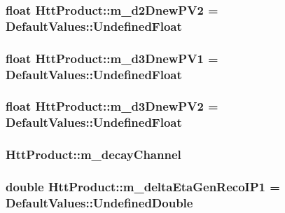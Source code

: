 \label{classHttProduct_a5cd0dab7ec8daff69e1540b1436141f2}
\hypertarget{classHttProduct_a0efa7a19a8e5b0e2129c91ae58cf24f4}{
\subsubsection[{m\_\-d2DnewPV2}]{\setlength{\rightskip}{0pt plus 5cm}float {\bf HttProduct::m\_\-d2DnewPV2} = DefaultValues::UndefinedFloat}}
\label{classHttProduct_a0efa7a19a8e5b0e2129c91ae58cf24f4}
\hypertarget{classHttProduct_a7ceef9ded23ad83000f89af8167cd962}{
\subsubsection[{m\_\-d3DnewPV1}]{\setlength{\rightskip}{0pt plus 5cm}float {\bf HttProduct::m\_\-d3DnewPV1} = DefaultValues::UndefinedFloat}}
\label{classHttProduct_a7ceef9ded23ad83000f89af8167cd962}
\hypertarget{classHttProduct_aef4f07e87a2d4ca39749fb4c2b5e8f60}{
\subsubsection[{m\_\-d3DnewPV2}]{\setlength{\rightskip}{0pt plus 5cm}float {\bf HttProduct::m\_\-d3DnewPV2} = DefaultValues::UndefinedFloat}}
\label{classHttProduct_aef4f07e87a2d4ca39749fb4c2b5e8f60}
\hypertarget{classHttProduct_ab1216927e208e9ad29a1e84d253ef03d}{
\subsubsection[{m\_\-decayChannel}]{ {\bf HttProduct::m\_\-decayChannel}}}
\label{classHttProduct_ab1216927e208e9ad29a1e84d253ef03d}
\hypertarget{classHttProduct_aac726a3ccc8029923223bcd08e75f010}{
\subsubsection[{m\_\-deltaEtaGenRecoIP1}]{\setlength{\rightskip}{0pt plus 5cm}double {\bf HttProduct::m\_\-deltaEtaGenRecoIP1} = DefaultValues::UndefinedDouble}}
